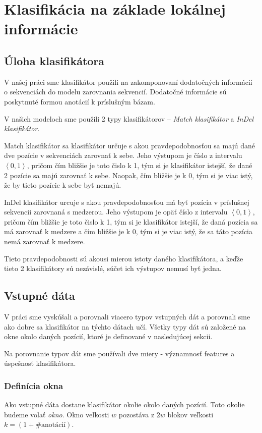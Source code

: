 \chapter[Klasifikácia]{Klasifikácia na základe lokálnej informácie}

\section{Úloha klasifikátora}

V našej práci sme klasifikátor použili na zakomponovaní dodatočných informácií o sekvenciách do modelu zarovnania sekvencií. Dodatočné informácie sú poskytnuté formou anotácií k príslušným bázam.

V našich modeloch sme použili 2 typy klasifikátorov -- \textit{Match klasifikátor} a \textit{InDel klasifikátor}.

Match klasifikátor sa klasifikátor určuje s akou pravdepodobnosťou sa majú dané dve pozície v sekvenciách zarovnať k sebe. Jeho výstupom je číslo z intervalu $\left<0,1\right>$, pričom čím bližšie je toto čislo k 1, tým si je klasifikátor istejší, že dané 2 pozície sa majú zarovnať k sebe. Naopak, čím bližšie je k 0, tým si je viac istý, že by tieto pozície k sebe byť nemajú.

InDel klasifikátor urcuje s akou pravdepodobnosťou má byť pozícia v príslušnej sekvencii zarovnaná s medzerou. Jeho výstupom je opäť  číslo z intervalu $\left<0,1\right>$, pričom čím bližšie je toto čislo k 1, tým si je klasifikátor istejší, že daná pozícia sa má zarovnať k medzere a čím bližšie je k 0, tým si je viac istý, že sa táto pozícia nemá zarovnať k medzere.

Tieto pravdepodobnosti sú akousi mierou istoty daného klasifikátora, a keďže tieto 2 klasifikátory sú nezávislé, súčet ich výstupov nemusí byť jedna.

\section{Vstupné dáta}

V práci sme vyskúšali a porovnali viacero typov vstupných dát a porovnali sme ako dobre sa klasifikátor na týchto dátach učí. Všetky typy dát sú založené na okne okolo daných pozícií, ktoré je definované v nasledujúcej sekcii.

Na porovnanie typov dát sme používali dve miery - významnosť \todo features a úspešnosť klasifikátora.

\subsection{Definícia okna}
\label{subsec:window}
Ako vstupné dáta dostane klasifikátor okolie okolo daných pozícií. Toto okolie budeme volať \textit{okno}. Okno veľkosti $w$ pozostáva z $2w$ blokov veľkosti $k = (1+\#\text{anotácií})$.

